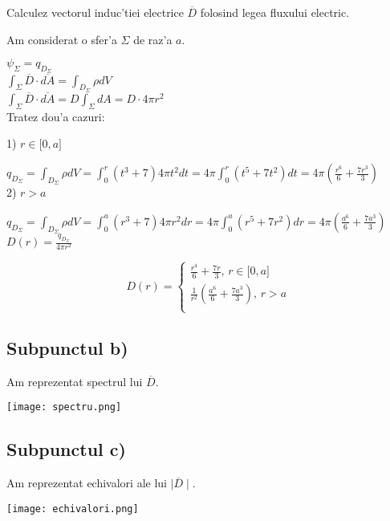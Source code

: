 \documentclass[titlepage, a4paper,12pt]{article}
\begin{document}
Calculez vectorul induc'tiei electrice $\overline{D}$ folosind legea fluxului electric. \par
Am considerat o sfer'a $\Sigma$ de raz'a $a$. 
\newpage
{\large
$\psi_{\Sigma} = q_{D_{\Sigma}}$ \\

$\int_{\Sigma}\overline{D}\cdot\overline{dA} = \int_{D_{\Sigma}} \rho dV$ \\

$\int_{\Sigma}\overline{D}\cdot\overline{dA} = D \int_{\Sigma}dA = D \cdot 4\pi r^2$\\

Tratez dou'a cazuri:

1) $r \in \big[0,a\big]$

$q_{D_{\Sigma}} = \int_{D_{\Sigma}} \rho dV = \int_{0}^{r}(t^3+7)4\pi t^2 dt = 4\pi \int_{0}^{r}(t^5+7t^2)dt = 4\pi (\frac{r^6}{6} + \frac{7r^3}{3})$ \\

2) $r > a$

$q_{D_{\Sigma}} = \int_{D_{\Sigma}} \rho dV = \int_{0}^{a}(r^3+7)4\pi r^2 dr = 4\pi \int_{0}^{a}(r^5+7r^2)dr = 4\pi (\frac{a^6}{6} + \frac{7a^3}{3})$ \\

$D(r) = \frac{q_{D_{\Sigma}}}{4\pi r^2}$

\[   
D(r) = 
     \begin{cases}
       \text{$\frac{r^4}{6} + \frac{7r}{3}$, $r \in \big[0,a\big]$} \\
       \text{$\frac{1}{r^2}(\frac{a^6}{6} + \frac{7a^3}{3})$, $r>a$} \\
     \end{cases}
\]}

\subsection{Subpunctul b)} \mbox{}
Am reprezentat spectrul lui $\overline{D}$.

\begin{center}
\texttt{[image: spectru.png]}
\end{center}

\subsection{Subpunctul c)} \mbox{}
Am reprezentat echivalori ale lui $\mid\overline{D}\mid$.

\begin{center}
\texttt{[image: echivalori.png]}
\end{center}
\end{document}
